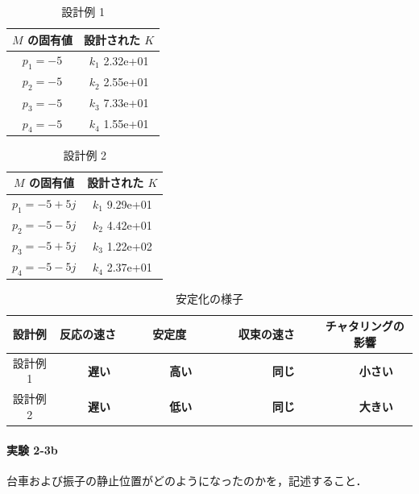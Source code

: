 \begin{table}[h]
  \centering
  \caption{設計例 1}
  \label{tab:design_example_1}
  \begin{tabular}{|c|c|}
    \hline
    \( M \) の固有値 & 設計された \( K \)  \\
    \hline
    \( p_1 = -5 \)   & \( k_1 \) 2.32e+01  \\
    \( p_2 = -5 \)   & \( k_2 \) 2.55e+01  \\
    \( p_3 = -5 \)   & \( k_3 \)  7.33e+01 \\
    \( p_4 = -5 \)   & \( k_4 \)  1.55e+01 \\
    \hline
  \end{tabular}
\end{table}

\begin{table}[h]
  \centering
  \caption{設計例 2}
  \label{tab:design_example_2}
  \begin{tabular}{|c|c|}
    \hline
    \( M \) の固有値    & 設計された \( K \)  \\
    \hline
    \( p_1 = -5 + 5j \) & \( k_1 \)  9.29e+01 \\
    \( p_2 = -5 - 5j \) & \( k_2 \) 4.42e+01  \\
    \( p_3 = -5 + 5j \) & \( k_3 \)  1.22e+02 \\
    \( p_4 = -5 - 5j \) & \( k_4 \)  2.37e+01 \\
    \hline
  \end{tabular}
\end{table}

\begin{table}[h]
  \centering
  \caption{安定化の様子}
  \label{tab:stabilization_observation}
  \begin{tabular}{|c|c|c|c|c|}
    \hline
    設計例   & 反応の速さ                    & 安定度                            & 収束の速さ                          & チャタリングの影響              \\
    \hline
    設計例 1 & {\large\textbf{　　遅い　　}} & {\large\textbf{　　高い　　}}     & {\large\textbf{　　　同じ　　　}}   & {\large\textbf{　　小さい　　}} \\
    設計例 2 & {\large\textbf{　　遅い　　}} & {\large\textbf{　　低い　　　　}} & {\large\textbf{　　　同じ　　　　}} & {\large\textbf{　　大きい　　}} \\
    \hline
  \end{tabular}
\end{table}

\paragraph{実験 2-3b}
台車および振子の静止位置がどのようになったのかを，記述すること．

